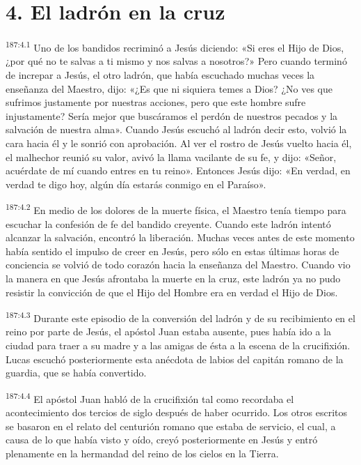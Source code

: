 \section*{4. El ladrón en la cruz}
\par 
\textsuperscript{187:4.1} Uno de los bandidos recriminó a Jesús diciendo: «Si eres el Hijo de Dios, ¿por qué no te salvas a ti mismo y nos salvas a nosotros?» Pero cuando terminó de increpar a Jesús, el otro ladrón, que había escuchado muchas veces la enseñanza del Maestro, dijo: «¿Es que ni siquiera temes a Dios? ¿No ves que sufrimos justamente por nuestras acciones, pero que este hombre sufre injustamente? Sería mejor que buscáramos el perdón de nuestros pecados y la salvación de nuestra alma». Cuando Jesús escuchó al ladrón decir esto, volvió la cara hacia él y le sonrió con aprobación. Al ver el rostro de Jesús vuelto hacia él, el malhechor reunió su valor, avivó la llama vacilante de su fe, y dijo: «Señor, acuérdate de mí cuando entres en tu reino». Entonces Jesús dijo: «En verdad, en verdad te digo hoy, algún día estarás conmigo en el Paraíso».

\par 
\textsuperscript{187:4.2} En medio de los dolores de la muerte física, el Maestro tenía tiempo para escuchar la confesión de fe del bandido creyente. Cuando este ladrón intentó alcanzar la salvación, encontró la liberación. Muchas veces antes de este momento había sentido el impulso de creer en Jesús, pero sólo en estas últimas horas de conciencia se volvió de todo corazón hacia la enseñanza del Maestro. Cuando vio la manera en que Jesús afrontaba la muerte en la cruz, este ladrón ya no pudo resistir la convicción de que el Hijo del Hombre era en verdad el Hijo de Dios.

\par 
\textsuperscript{187:4.3} Durante este episodio de la conversión del ladrón y de su recibimiento en el reino por parte de Jesús, el apóstol Juan estaba ausente, pues había ido a la ciudad para traer a su madre y a las amigas de ésta a la escena de la crucifixión. Lucas escuchó posteriormente esta anécdota de labios del capitán romano de la guardia, que se había convertido.

\par 
\textsuperscript{187:4.4} El apóstol Juan habló de la crucifixión tal como recordaba el acontecimiento dos tercios de siglo después de haber ocurrido. Los otros escritos se basaron en el relato del centurión romano que estaba de servicio, el cual, a causa de lo que había visto y oído, creyó posteriormente en Jesús y entró plenamente en la hermandad del reino de los cielos en la Tierra.

